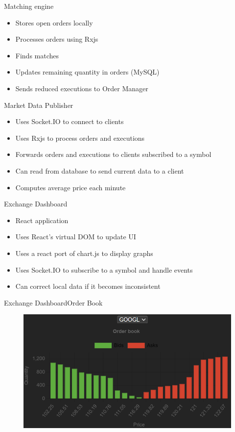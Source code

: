 \documentclass{beamer}
\begin{document}
\begin{frame}{Matching engine}
	\begin{itemize}
		\item Stores open orders locally
		\item Processes orders using Rxjs
		\item Finds matches
		\item Updates remaining quantity in orders (MySQL)
		\item Sends reduced executions to Order Manager
	\end{itemize}
\end{frame}
\begin{frame}{Market Data Publisher}
	\begin{itemize}
		\item Uses Socket.IO to connect to clients
		\item Uses Rxjs to process orders and executions
		\item Forwards orders and executions to clients subscribed to a symbol
		\item Can read from database to send current data to a client
		\item Computes average price each minute
	\end{itemize}
\end{frame}
\begin{frame}{Exchange Dashboard}
	\begin{itemize}
		\item React application
		\item Uses React's virtual DOM to update UI
		\item Uses a react port of chart.js to display graphs
		\item Uses Socket.IO to subscribe to a symbol and handle events
		\item Can correct local data if it becomes inconsistent
	\end{itemize}
\end{frame}
\begin{frame}{Exchange Dashboard}{Order Book}
	\begin{figure}
		\includegraphics[width=\textwidth]{order-book.png}
	\end{figure}
\end{frame}
\end{document}
